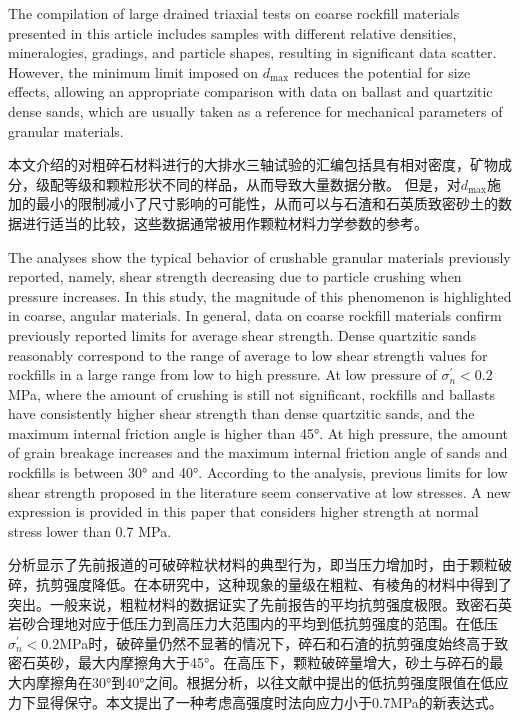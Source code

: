 \begin{ParaColumn}
    
    The compilation of large drained triaxial tests on coarse rockfill materials presented in this article includes samples with different relative densities, mineralogies, gradings, and particle shapes, resulting in significant data scatter. However, the minimum limit imposed on $d_{\max}$ reduces the potential for size effects, allowing an appropriate comparison with data on ballast and quartzitic dense sands, which are usually taken as a reference for mechanical parameters of granular materials.

    \switchcolumn

    本文介绍的对粗碎石材料进行的大排水三轴试验的汇编包括具有相对密度，矿物成分，级配等级和颗粒形状不同的样品，从而导致大量数据分散。 但是，对$d_{\max}$施加的最小的限制减小了尺寸影响的可能性，从而可以与石渣和石英质致密砂土的数据进行适当的比较，这些数据通常被用作颗粒材料力学参数的参考。
    
    \switchcolumn*

    The analyses show the typical behavior of crushable granular materials previously reported, namely, shear strength decreasing due to particle crushing when pressure increases. In this study, the magnitude of this phenomenon is highlighted in coarse, angular materials. In general, data on coarse rockfill materials confirm previously reported limits for average shear strength. Dense quartzitic sands reasonably correspond to the range of average to low shear strength values for rockfills in a large range from low to high pressure. At low pressure of $\sigma_n^\prime<0.2$ MPa, where the amount of crushing is still not significant, rockfills and ballasts have consistently higher shear strength than dense quartzitic sands, and the maximum internal friction angle is higher than 45°. At high pressure, the amount of grain breakage increases and the maximum internal friction angle of sands and rockfills is between 30° and 40°. According to the analysis, previous limits for low shear strength proposed in the literature seem conservative at low stresses. A new expression is provided in this paper that considers higher strength at normal stress lower than 0.7 MPa.

    \switchcolumn

    分析显示了先前报道的可破碎粒状材料的典型行为，即当压力增加时，由于颗粒破碎，抗剪强度降低。在本研究中，这种现象的量级在粗粒、有棱角的材料中得到了突出。一般来说，粗粒材料的数据证实了先前报告的平均抗剪强度极限。致密石英岩砂合理地对应于低压力到高压力大范围内的平均到低抗剪强度的范围。在低压$\sigma_n^\prime<0.2$MPa时，破碎量仍然不显著的情况下，碎石和石渣的抗剪强度始终高于致密石英砂，最大内摩擦角大于45°。在高压下，颗粒破碎量增大，砂土与碎石的最大内摩擦角在30°到40°之间。根据分析，以往文献中提出的低抗剪强度限值在低应力下显得保守。本文提出了一种考虑高强度时法向应力小于0.7MPa的新表达式。


\end{ParaColumn}
